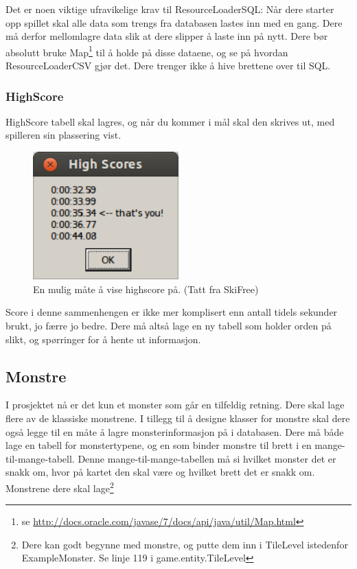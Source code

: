 \documentclass[norsk]{article}
\begin{document}
Det er noen viktige ufravikelige krav til ResourceLoaderSQL:
Når dere starter opp spillet skal alle data som trengs fra databasen lastes inn med en gang. Dere må derfor mellomlagre data slik at dere slipper å laste inn på nytt.
Dere bør absolutt bruke Map\footnote{se \url{http://docs.oracle.com/javase/7/docs/api/java/util/Map.html}} til å holde på disse dataene, og se på hvordan ResourceLoaderCSV gjør det.
Dere trenger ikke å hive brettene over til SQL.

\subsubsection{HighScore}
\label{subsec:highscore}
HighScore tabell skal lagres, og når du kommer i mål skal den skrives ut, med spilleren sin plassering vist.
\begin{figure}[h!]
  \caption{En mulig måte å vise highscore på. (Tatt fra SkiFree)}
  \centering
    \includegraphics[width=0.5\textwidth]{Mulig-HighScore.png}
\end{figure}

Score i denne sammenhengen er ikke mer komplisert enn antall tidels sekunder brukt, jo færre jo bedre.
Dere må altså lage en ny tabell som holder orden på slikt, og spørringer for å hente ut informasjon.

\subsection{Monstre}
\label{subsec:monster}
I prosjektet nå er det kun et monster som går en tilfeldig retning. Dere skal lage flere av de klassiske monstrene.
I tillegg til å designe klasser for monstre skal dere også legge til en måte å lagre monsterinformasjon på i databasen.
Dere må både lage en tabell for monstertypene, og en som binder monstre til brett i en mange-til-mange-tabell. Denne mange-til-mange-tabellen må si hvilket monster det er snakk om, hvor på kartet den skal være og hvilket brett det er snakk om.
Monstrene dere skal lage\footnote{Dere kan godt begynne med monstre, og putte dem inn i TileLevel istedenfor ExampleMonster. Se linje 119 i game.entity.TileLevel}\\
\end{document}
